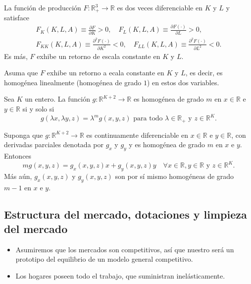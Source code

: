 \begin{suppose}
La función de producción $F\colon\mathds{R}^{3}_{+}\rightarrow\mathds{R}$ es dos veces diferenciable en $K$ y $L$ y satisface
\begin{align*}
F_{K}\left(K,L,A\right)\equiv\frac{\partial F}{\partial K}>0,\quad F_{L}\left(K,L,A\right)\equiv\frac{\partial F\left(\cdot\right)}{\partial L}>0,\\
F_{KK}\left(K,L,A\right)\equiv\frac{\partial^{2}F\left(\cdot\right)}{\partial K^{2}}<0,\quad F_{LL}\left(K,L,A\right)\equiv\frac{\partial^{2}F\left(\cdot\right)}{\partial L^{2}}<0.
\end{align*}
Es más, $F$ exhibe un retorno de escala constante en $K$ y $L$.
\end{suppose}
Asuma que $F$ exhibe un retorno a ecala constante en $K$ y $L$, es decir, es homogénea linealmente (homogénea de grado $1$) en estos dos variables.
\begin{definition}
Sea $K$ un entero. La función $g\colon\mathds{R}^{K+2}\rightarrow\mathds{R}$ es homogénea de grado $m$ en $x\in\mathds{R}$ e $y\in\mathds{R}$ si y solo si \[ g\left(\lambda x,\lambda y, z\right)=\lambda^{m}g\left(x,y,z\right)\text{ para todo }\lambda\in\mathds{R}_{+}\text{ y }z\in\mathds{R}^{K}. \]
\end{definition}
\begin{theorem}[Euler]
Suponga que $g\colon\mathds{R}^{K+2}\rightarrow\mathds{R}$ es continuamente diferenciable en $x\in\mathds{R}$ e $y\in\mathds{R}$, con derivadas parciales denotada por $g_{x}$ y $g_{y}$ y es homogénea de grado $m$ en $x$ e $y$. Entonces \[ mg\left(x,y,z\right)=g_{x}\left(x,y,z\right)x+g_{y}\left(x,y,z\right)y\quad\forall x\in\mathds{R},y\in\mathds{R}\text{ y }z\in\mathds{R}^{K}. \] Más aún, $g_{x}\left(x,y,z\right)$ y $g_{y}\left(x,y,z\right)$ son por sí mismo homogéneas de grado $m-1$ en $x$ e $y$.
\end{theorem}

\subsection{Estructura del mercado, dotaciones y limpieza del mercado}
\begin{itemize}
	\item Asumiremos que los mercados son competitivos, así que nuestro será un prototipo del equilibrio de un modelo general competitivo.
	\item Los hogares poseen todo el trabajo, que suministran inelásticamente.
\end{itemize}